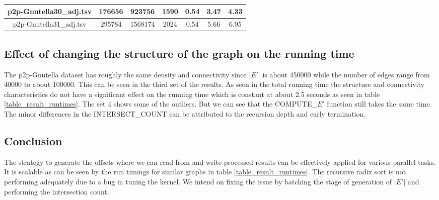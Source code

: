 \documentclass[conference]{IEEEtran}
\begin{document}
\begin{table*}[ht]
\begin{tabular}{|c || c | c | c || c | c | c |}
 p2p-Gnutella30\_adj.tsv & 176656 & 923756 & 1590 & 0.54 & 3.47 & 4.33 \\
 \hline
 p2p-Gnutella31\_adj.tsv & 295784 & 1568174 & 2024 & 0.54 & 5.66 & 6.95 \\
 \hline
\end{tabular}
 \caption{Four sets of results. The first set consists of graphs with zero, many and some triangles in that order. The second consists of the outliers from the first set. The third collection represents graphs where the number of edges varies as well as the size of the set $E'$ varies but the running time is roughly constant. The last set contains outliers; the number of edges as well as the size of $E'$ generated doubles causing run time to double and triple.}
 \label{table_result_runtimes}
\end{table*}

\subsection{Effect of changing the structure of the graph on the running time}
The p2p-Gnutella dataset has roughly the same density and connectivity since $|E'|$ is about 450000 while the number of edges range from 40000 to about 100000. This can be seen in the third set of the results. As seen in the total running time the structure and connectivity characteristics do not have a significant effect on the running time which is constant at about 2.5 seconds as seen in table \ref{table_result_runtimes}. The set 4 shows some of the outliers. But we can see that the COMPUTE\_$E'$ function still takes the same time. The minor differences in the INTERSECT\_COUNT can be attributed to the recursion depth and early termination. 

\subsection{Conclusion}
The strategy to generate the offsets where we can read from and write processed results can be effectively applied for various parallel tasks. It is scalable as can be seen by the run timings for similar graphs in table \ref{table_result_runtimes}. The recursive radix sort is not performing adequately due to a bug in tuning the kernel. 
We intend on fixing the issue by batching the stage of generation of $|E'|$ and performing the intersection count.
\end{document}
